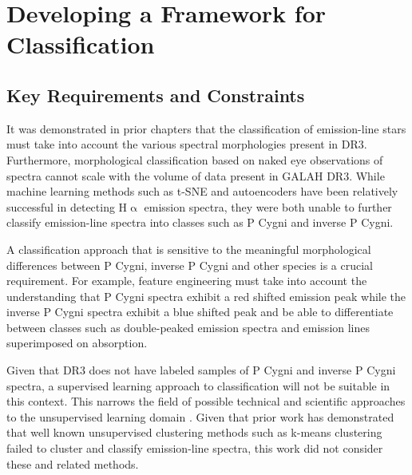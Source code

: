 \chapter{Developing a Framework for Classification}

\section{Key Requirements and Constraints}

It was demonstrated in prior chapters that the classification of emission-line stars must take into account the various spectral morphologies present in DR3. Furthermore, morphological classification based on naked eye observations of spectra cannot scale with the volume of data present in GALAH DR3. While machine learning methods such as t-SNE and autoencoders \cite{traven2017galah}\cite{vcotar2021galah} have been relatively successful in detecting H$\upalpha$ emission spectra, they were both unable to further classify emission-line spectra into classes such as P Cygni and inverse P Cygni.

A classification approach that is sensitive to the meaningful morphological differences between P Cygni, inverse P Cygni and other species is a crucial requirement. For example, feature engineering must take into account the understanding that P Cygni spectra exhibit a red shifted emission peak while the inverse P Cygni spectra exhibit a blue shifted peak and be able to differentiate between classes such as double-peaked emission spectra and emission lines superimposed on absorption.

Given that DR3 does not have labeled samples of P Cygni and inverse P Cygni spectra, a supervised learning approach to classification will not be suitable in this context. This narrows the field of possible technical and scientific approaches to the unsupervised learning domain \cite{hastie2009elements}. Given that prior work has demonstrated that well known unsupervised clustering methods such as k-means clustering failed to cluster and classify emission-line spectra, this work did not consider these and related methods. 

